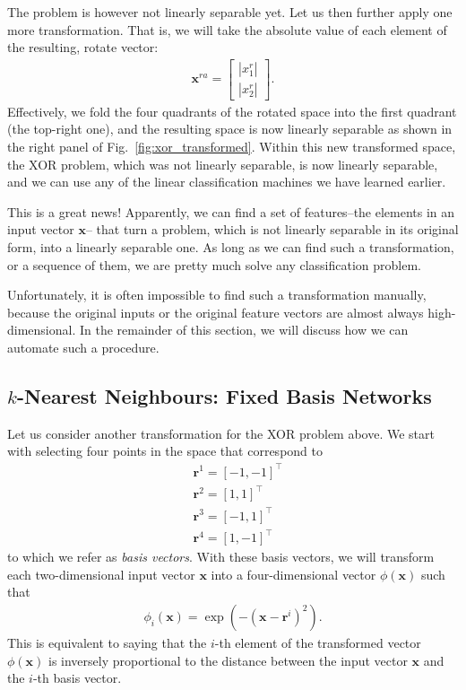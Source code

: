 \documentclass{report}
\newcommand{\vect}[1]{\mathbf{#1}}
\newcommand{\vx}[0]{\vect{x}}
\newcommand{\vr}[0]{\vect{r}}
\begin{document}
The problem is however not linearly separable yet. Let us then further apply one
more transformation. That is, we will take the absolute value of each element of
the resulting, rotate vector:
\begin{align*}
    \vx^{ra} = \left[ 
        \begin{array}{c}
            |x^r_1| \\
            |x^r_2|
        \end{array}
    \right].
\end{align*}
Effectively, we fold the four quadrants of the rotated space into the first
quadrant (the top-right one), and the resulting space is now linearly separable
as shown in the right panel of Fig.~\ref{fig:xor_transformed}.  Within this new
transformed space, the XOR problem, which was not linearly separable, is now
linearly separable, and we can use any of the linear classification machines we
have learned earlier. 

This is a great news! Apparently, we can find a set of features--the elements in
an input vector $\vx$-- that turn a problem, which is not linearly separable in
its original form, into a linearly separable one. As long as we can find such a
transformation, or a sequence of them, we are pretty much solve any
classification problem.  

Unfortunately, it is  often impossible to find such a transformation manually,
because the original inputs or the original feature vectors are almost always
high-dimensional. In the remainder of this section, we will discuss how we can
automate such a procedure. 

\subsection{$k$-Nearest Neighbours: Fixed Basis Networks}

Let us consider another transformation for the XOR problem above. We start with
selecting four points in the space that correspond to 
\begin{align*}
    &\vr^1 = [-1, -1]^\top \\
    &\vr^2 = [1, 1]^\top \\
    &\vr^3 = [-1, 1]^\top \\
    &\vr^4 = [1, -1]^\top 
\end{align*}
to which we refer as {\it basis vectors}. With these basis vectors, we will
transform each two-dimensional input vector $\vx$ into a four-dimensional vector
$\phi(\vx)$ such that
\begin{align}
    \label{eq:rbf}
    \phi_i(\vx) = \exp\left( -(\vx - \vr^i)^2 \right).
\end{align}
This is equivalent to saying that the $i$-th element of the transformed vector
$\phi(\vx)$ is inversely proportional to the distance between the input vector
$\vx$ and the $i$-th basis vector. 
\end{document}
